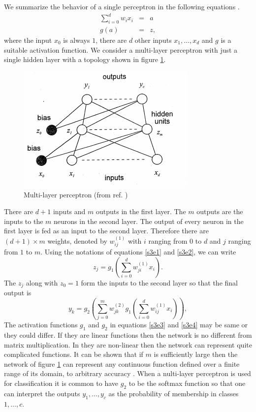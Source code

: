 \documentclass[11pt]{article}
\numberwithin{equation}{section}
\begin{document}
We summarize the behavior of a single perceptron in the following
equations \cite{bishop1994neural}.
\begin{eqnarray}
\sum_{i=0}^d w_i x_i &=& a \label{s3e1} \\
g(a) &=& z \label{s3e2},
\end{eqnarray}
where the input $x_0$ is always $1$, there are $d$ other inputs $x_1, 
\ldots, x_d$ and $g$ is a suitable activation function. We consider a
multi-layer perceptron with just a single hidden layer with a topology
shown in figure \ref{f4}.
\begin{figure}[!ht]
\centering
\includegraphics[scale=0.8]{mlp}
\caption{Multi-layer perceptron (from ref. \cite{bishop1994neural})}
\label{f4}
\end{figure}
There are $d + 1$ inputs and $m$ outputs in the first layer. The $m$ 
outputs are the inputs to the $m$ neurons in the second layer. The output
of every neuron in the first layer is fed as an input to the second layer.
Therefore there are $(d + 1) \times m$ weights, denoted by $w_{ij}^{(1)}$ with
$i$ ranging from $0$ to $d$ and $j$ ranging from $1$ to $m$. Using the 
notations of equations \eqref{s3e1} and \eqref{s3e2}, we can write
\begin{equation}\label{s3e3}
z_j = g_1\left(\sum_{i=0}^d w_{ji}^{(1)}x_i\right).
\end{equation}
The $z_j$ along with $z_0 = 1$ form the inputs to the second layer so that 
the final output is
\begin{equation}\label{s3e4}
y_k = g_2\left(\sum_{j=0}^m w^{(2)}_{jk} g_1\left(\sum_{i=0}^d w^{(1)}_{ij}x_i
\right)\right),
\end{equation}
The activation functions $g_1$ and $g_2$ in equations \eqref{s3e3} and 
\eqref{s3e4} may be same or they could differ. If they are linear functions
then the network is no different from matrix multiplication. In they are
non-linear then the network can represent quite complicated functions. It can
be shown that if $m$ is sufficiently large then the network of figure \ref{f4}
can represent any continuous function defined over a finite range of its
domain, to arbitrary accuracy \cite{bishop1994neural}. When a nulti-layer
perceptron is used for classification it is common to have $g_2$ to be the
softmax function so that one can interpret the outputs $y_1, \ldots, y_c$ as
the probability of membership in classes $1, \ldots, c$.
\end{document}
